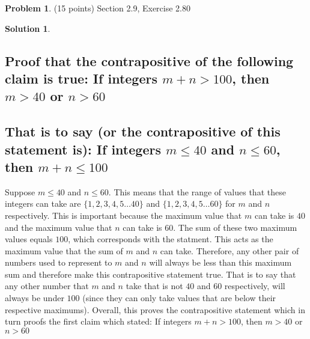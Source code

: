 \documentclass{article}
\theoremstyle{definition}
\newtheorem{problem}{Problem}
\newtheorem*{solution}{Solution}
\begin{document}
\newpage
\begin{problem} (15 points) Section 2.9, Exercise 2.80 
\end{problem}
\begin{solution}
\hspace{1cm}
\subsection*{Proof that the contrapositive of the following claim is true: If integers $m + n > 100$, then $m > 40$ or $n > 60$\\\\
That is to say (or the contrapositive of this statement is): If integers $m \le 40$ and $n \le 60$, then $m + n \le 100$}
Suppose $m \le 40$ and $n \le 60$. This means that the range of values that these integers can take are $\{1,2,3,4,5\ldots 40\}$ and $\{1,2,3,4,5\ldots60\}$ for $m$ and $n$ respectively. This is important because the maximum value that $m$ can take is $40$ and the maximum value that $n$ can take is $60$. The sum of these two maximum values equals $100$, which corresponds with the statment. This acts as the maximum value that the sum of $m$ and $n$ can take. Therefore, any other pair of numbers used to represent to $m$ and $n$ will always be less than this maximum sum and therefore make this contrapositive statement true. That is to say that any other number that $m$ and $n$ take that is not $40$ and $60$ respectively, will always be under $100$ (since they can only take values that are below their respective maximums). Overall, this proves the contrapositive statement which in turn proofs the first claim which stated: If integers $m + n > 100$, then $m > 40$ or $n > 60$
\end{solution}
\end{document}
